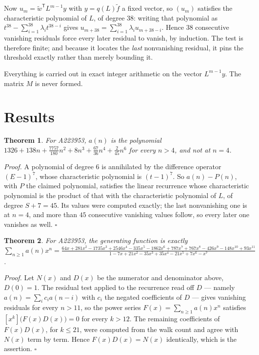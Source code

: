 \documentclass[11pt]{article}
\newtheorem{theorem}{Theorem}
\theoremstyle{definition}
\begin{document}
Now $u_m = \tilde w^{\mathsf T} L^{m-1} y$ with $y = q(L)\tilde f$ a fixed vector, so $(u_m)$ satisfies the characteristic polynomial of $L$, of degree $38$: writing that polynomial as $t^{38} - \sum_{i=1}^{38} \lambda_i t^{38-i}$ gives $u_{m+38} = \sum_{i=1}^{38} \lambda_i u_{m+38-i}$. Hence $38$ consecutive vanishing residuals force every later residual to vanish, by induction. The test is therefore finite; and because it locates the {\itshape last} nonvanishing residual, it pins the threshold exactly rather than merely bounding it.

Everything is carried out in exact integer arithmetic on the vector $L^{m-1}y$. The matrix $M$ is never formed.

\section{Results}

\begin{theorem} For A223953, $a(n)$ is the polynomial $1326 + 138n + \frac{7757}{180}n^{2} + 8n^{3} + \frac{67}{36}n^{4} + \frac{2}{45}n^{6}$ for every $n > 4$, and not at $n = 4$.\end{theorem}

{\itshape Proof.} A polynomial of degree $6$ is annihilated by the difference operator $(E-1)^{7}$, whose characteristic polynomial is $(t-1)^{7}$. So $a(n) - P(n)$, with $P$ the claimed polynomial, satisfies the linear recurrence whose characteristic polynomial is the product of that with the characteristic polynomial of $L$, of degree $S + 7 = 45$. Its values were computed exactly; the last nonvanishing one is at $n = 4$, and more than $45$ consecutive vanishing values follow, so every later one vanishes as well. $\square$

\begin{theorem} For A223953, the generating function is exactly $\sum_{n\ge 1} a(n)x^n = \frac{64x + 281x^{2} - 1735x^{3} + 2546x^{4} - 335x^{5} - 1862x^{6} + 787x^{7} + 767x^{8} - 426x^{9} - 148x^{10} + 93x^{11}}{1 - 7x + 21x^{2} - 35x^{3} + 35x^{4} - 21x^{5} + 7x^{6} - x^{7}}$.\end{theorem}

{\itshape Proof.} Let $N(x)$ and $D(x)$ be the numerator and denominator above, $D(0)=1$. The residual test applied to the recurrence read off $D$ --- namely $a(n) = \sum_i c_i a(n-i)$ with $c_i$ the negated coefficients of $D$ --- gives vanishing residuals for every $n > 11$, so the power series $F(x)=\sum_{n\ge 1}a(n)x^n$ satisfies $[x^k]\bigl(F(x)D(x)\bigr) = 0$ for every $k > 12$. The remaining coefficients of $F(x)D(x)$, for $k \le 21$, were computed from the walk count and agree with $N(x)$ term by term. Hence $F(x)D(x) = N(x)$ identically, which is the assertion. $\square$
\end{document}
